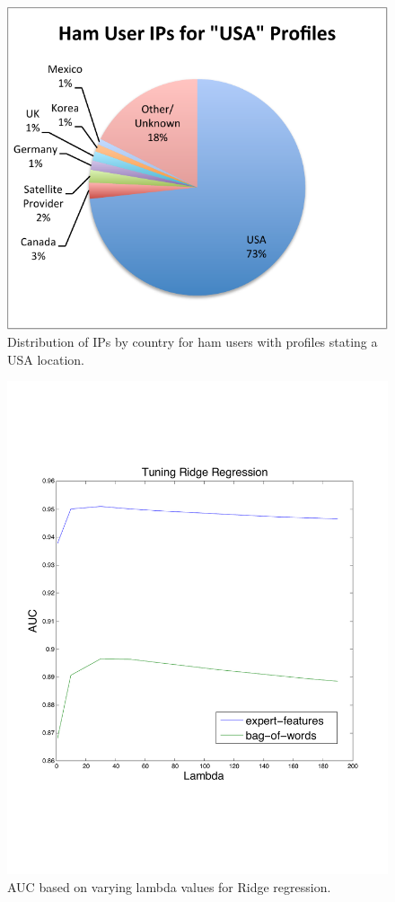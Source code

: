 \documentclass[preprint]{acm_proc_article-sp}
\begin{document}
\begin{figure}[h]
    \centering
    \includegraphics[width=\linewidth]{figures/ips-usa-ham.pdf}
    \caption{Distribution of IPs by country for ham users with profiles stating a USA location.}
    \label{fig:usaham}
\end{figure}


\begin{figure}[h]
    \centering
    \includegraphics[width=\linewidth]{figures/linear-ridge.pdf}
    \caption{AUC based on varying lambda values for Ridge regression.}
    \label{fig:lambda}
\end{figure}
\end{document}
